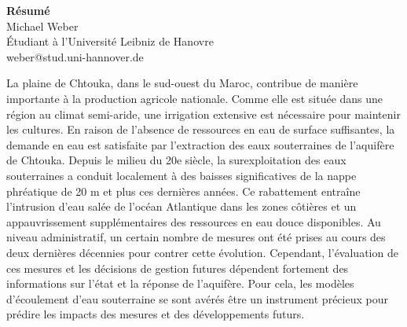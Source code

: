 \thispagestyle{plain}
\begin{center}
    \LARGE
    \textbf{Résumé}\\
    \vspace{1cm}
    \hspace{0pt}
    \large
    Michael Weber \\
    \vspace{0.5cm}
    \small
    Étudiant à l'Université Leibniz de Hanovre\\
    weber@stud.uni-hannover.de

    \vspace{0.7cm}
\end{center}

\normalsize

La plaine de Chtouka, dans le sud-ouest du Maroc, contribue de manière importante à la production agricole nationale. Comme elle est située dans une région au climat semi-aride, une irrigation extensive est nécessaire pour maintenir les cultures. En raison de l'absence de ressources en eau de surface suffisantes, la demande en eau est satisfaite par l'extraction des eaux souterraines de l'aquifère de Chtouka. Depuis le milieu du 20e siècle, la surexploitation des eaux souterraines a conduit localement à des baisses significatives de la nappe phréatique de 20 m et plus ces dernières années. Ce rabattement entraîne l'intrusion d'eau salée de l'océan Atlantique dans les zones côtières et un appauvrissement supplémentaires des ressources en eau douce disponibles. Au niveau administratif, un certain nombre de mesures ont été prises au cours des deux dernières décennies pour contrer cette évolution. Cependant, l'évaluation de ces mesures et les décisions de gestion futures dépendent fortement des informations sur l'état et la réponse de l'aquifère. Pour cela, les modèles d'écoulement d'eau souterraine se sont avérés être un instrument précieux pour prédire les impacts des mesures et des développements futurs.

